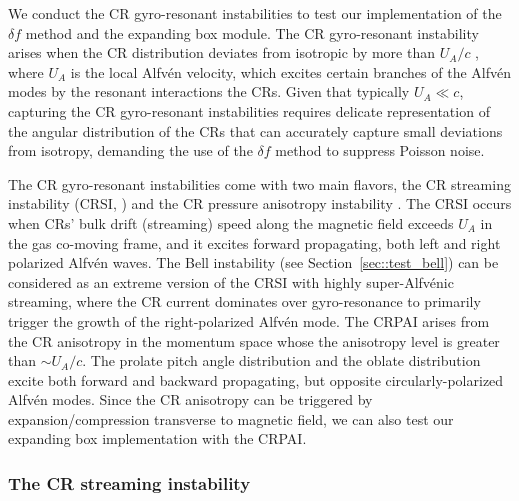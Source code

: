 \documentclass[fleqn,usenatbib]{mnras}
\begin{document}
We conduct the CR gyro-resonant instabilities to test our implementation of the $\delta f$ method and the expanding box module.
The CR gyro-resonant instability arises when the CR distribution deviates from isotropic by more than $U_A/c$ \citep{2005ppa..book.....K}, where $U_A$ is the local Alfv\'en velocity, which excites certain branches of the Alfv\'en modes by the resonant interactions the CRs. Given that typically $U_A\ll c$, capturing the CR gyro-resonant instabilities requires delicate representation of the angular distribution of the CRs that can accurately capture small deviations from isotropy, demanding the use of the $\delta f$ method \citep{2019ApJ...876...60B} to suppress Poisson noise.

The CR gyro-resonant instabilities come with two main flavors,
the CR streaming instability (CRSI, \citealp{1969ApJ...156..445K}) and the CR pressure anisotropy instability \citep[CRPAI ][]{2006MNRAS.373.1195L, 2020ApJ...890...67Z, 2018MNRAS.476.2779L}. The CRSI occurs when CRs' bulk drift (streaming) speed along the magnetic field exceeds $U_A$ in the gas co-moving frame, and it excites forward propagating, both left and right polarized Alfv\'en waves. The Bell instability (see Section~\ref{sec::test_bell}) can be considered as an extreme version of the CRSI with highly super-Alfv\'enic streaming, where the CR current dominates over gyro-resonance to primarily trigger the growth of the right-polarized Alfv\'en mode.
The CRPAI arises from the CR anisotropy in the momentum space whose the anisotropy level is greater than $\sim U_A/c$. The prolate pitch angle distribution and the oblate distribution excite both forward and backward propagating, but opposite circularly-polarized Alfv\'en modes. Since the CR anisotropy can be triggered by expansion/compression transverse to magnetic field, we can also test our expanding box implementation with the CRPAI.

\subsubsection{The CR streaming instability}
\label{sec::test_streaming}
\end{document}
